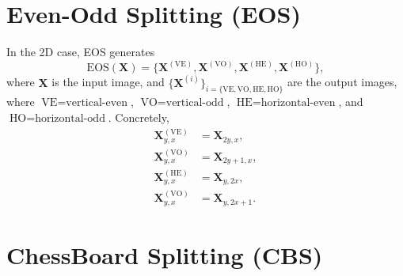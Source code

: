 \documentclass{article}
\begin{document}

\section{Even-Odd Splitting (EOS)}
\label{sec:EOS}

In the 2D case, EOS generates
\begin{equation}
  \mathrm{EOS}(\mathbf{X})=\{\mathbf{X}^{(\text{VE})}, \mathbf{X}^{(\text{VO})}, \mathbf{X}^{(\text{HE})}, \mathbf{X}^{(\text{HO})}\},
\end{equation}
where $\mathbf{X}$ is the input image, and $\{\mathbf{X}^{(i)}\}_{i=\{\text{VE}, \text{VO}, \text{HE}, \text{HO}\}}$
  are the output images, where $\text{VE}=\text{vertical-even}$,
  $\text{VO}=\text{vertical-odd}$, $\text{HE}=\text{horizontal-even}$,
  and $\text{HO}=\text{horizontal-odd}$. Concretely,
  \begin{align}
    \mathbf{X}^{(\text{VE})}_{y,x} & = \mathbf{X}_{2y,x}, \\
    \mathbf{X}^{(\text{VO})}_{y,x} & = \mathbf{X}_{2y+1,x}, \\
    \mathbf{X}^{(\text{HE})}_{y,x} & = \mathbf{X}_{y,2x},\\
    \mathbf{X}^{(\text{VO})}_{y,x} & = \mathbf{X}_{y,2x+1}.
  \end{align}
  

\section{ChessBoard Splitting (CBS)}
\label{sec:CBS}
\end{document}
